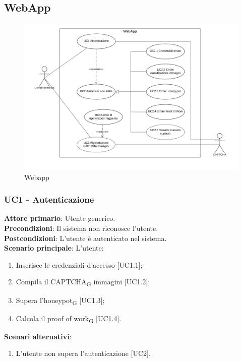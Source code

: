 \subsection{WebApp}

\begin{figure}[H]
    \centering
    \includegraphics[scale=0.6]{img/web_app.png}
    \caption{Webapp}
\end{figure}

\subsubsection{UC1 - Autenticazione}
\textbf{Attore primario}: Utente generico.\\
\textbf{Precondizioni}: Il sistema non riconosce l'utente.\\
\textbf{Postcondizioni}: L'utente è autenticato nel sistema.\\

\textbf{Scenario principale}: L'utente:
\begin{enumerate}
\item Inserisce le credenziali d'accesso [UC1.1];
\item Compila il CAPTCHA\textsubscript{G} immagini [UC1.2];
\item Supera l'honeypot\textsubscript{G} [UC1.3];
\item Calcola il proof of work\textsubscript{G} [UC1.4].
\end{enumerate}

\textbf{Scenari alternativi}:
\begin{enumerate}
    \item L’utente non supera l'autenticazione [UC2].
\end{enumerate}

